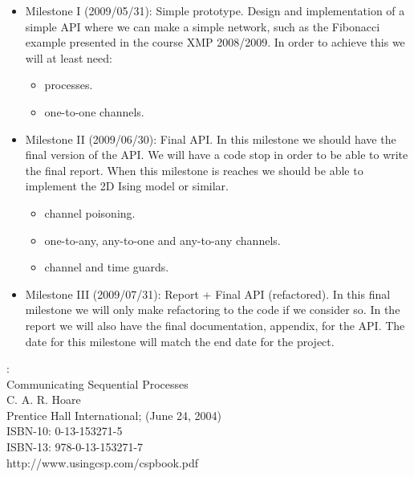 \documentclass[a4paper,12pt]{article}
\begin{document}
\begin{itemize}
 \item Milestone I (2009/05/31): Simple prototype. Design and implementation of
   a simple API where we can make a simple network, such as the Fibonacci
   example presented in the course XMP 2008/2009. In order to achieve this we
   will at least need:
   \begin{itemize}
     \item processes.
     \item one-to-one channels.
   \end{itemize}
 \item Milestone II (2009/06/30): Final API. In this milestone we should
   have the final version of the API. We will have a code stop in order to be
   able to write the final report. When this milestone is reaches we should be
   able to implement the 2D Ising model or similar.
   \begin{itemize}
     \item channel poisoning.
     \item one-to-any, any-to-one and any-to-any channels.
     \item channel and time guards.
   \end{itemize}
 \item Milestone III (2009/07/31): Report + Final API (refactored). In this
   final milestone we will only make refactoring to the code if we consider so.
   In the report we will also have the final documentation, appendix, for the
   API. The date for this milestone will match the end date for the project.
\end{itemize}

\begin{thebibliography}{99}

:\\
Communicating Sequential Processes\\
C. A. R. Hoare\\
Prentice Hall International; (June 24, 2004)\\
ISBN-10: 0-13-153271-5\\
ISBN-13: 978-0-13-153271-7\\
http://www.usingcsp.com/cspbook.pdf

\end{thebibliography}
\end{document}
